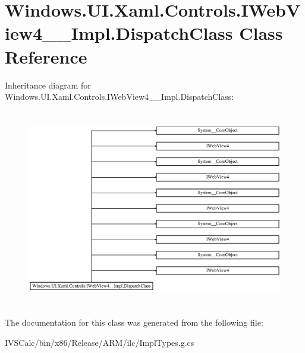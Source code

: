 \hypertarget{class_windows_1_1_u_i_1_1_xaml_1_1_controls_1_1_i_web_view4_____impl_1_1_dispatch_class}{}\section{Windows.\+U\+I.\+Xaml.\+Controls.\+I\+Web\+View4\+\_\+\+\_\+\+Impl.\+Dispatch\+Class Class Reference}
\label{class_windows_1_1_u_i_1_1_xaml_1_1_controls_1_1_i_web_view4_____impl_1_1_dispatch_class}
Inheritance diagram for Windows.\+U\+I.\+Xaml.\+Controls.\+I\+Web\+View4\+\_\+\+\_\+\+Impl.\+Dispatch\+Class\+:\begin{figure}[H]
\begin{center}
\leavevmode
\includegraphics[height=8.676057cm]{class_windows_1_1_u_i_1_1_xaml_1_1_controls_1_1_i_web_view4_____impl_1_1_dispatch_class}
\end{center}
\end{figure}


The documentation for this class was generated from the following file\+:\begin{DoxyCompactItemize}
\item 
I\+V\+S\+Calc/bin/x86/\+Release/\+A\+R\+M/ilc/Impl\+Types.\+g.\+cs\end{DoxyCompactItemize}
